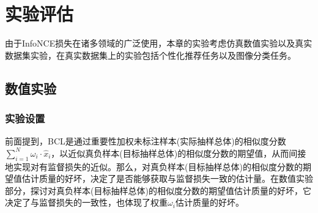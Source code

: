 
\section{实验评估}
由于InfoNCE损失在诸多领域的广泛使用，本章的实验考虑仿真数值实验以及真实数据集实验，在真实数据集上的实验包括个性化推荐任务以及图像分类任务。
\subsection{数值实验}

\subsubsection{实验设置}
前面提到，BCL是通过重要性加权未标注样本(实际抽样总体)的相似度分数$\sum_{i=1}^N \omega_i \cdot \hat{x}_i$，以近似真负样本(目标抽样总体)的相似度分数的期望值，从而间接地实现对有监督损失的近似。那么，对真负样本(目标抽样总体)的相似度分数的期望值估计质量的好坏，决定了是否能够获取与监督损失一致的估计量。在数值实验部分，探讨对真负样本(目标抽样总体)的相似度分数的期望值估计质量的好坏，它决定了与监督损失的一致性，也体现了权重$\omega_i$估计质量的好坏。

